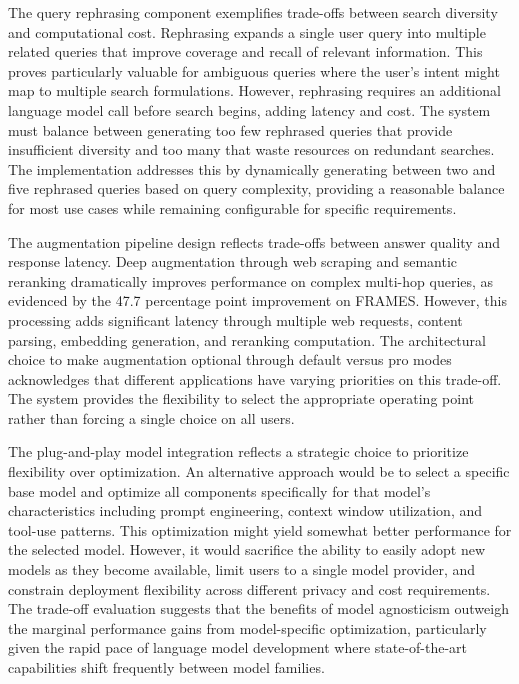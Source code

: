 The query rephrasing component exemplifies trade-offs between search diversity and computational cost. Rephrasing expands a single user query into multiple related queries that improve coverage and recall of relevant information. This proves particularly valuable for ambiguous queries where the user's intent might map to multiple search formulations. However, rephrasing requires an additional language model call before search begins, adding latency and cost. The system must balance between generating too few rephrased queries that provide insufficient diversity and too many that waste resources on redundant searches. The implementation addresses this by dynamically generating between two and five rephrased queries based on query complexity, providing a reasonable balance for most use cases while remaining configurable for specific requirements.

The augmentation pipeline design reflects trade-offs between answer quality and response latency. Deep augmentation through web scraping and semantic reranking dramatically improves performance on complex multi-hop queries, as evidenced by the 47.7 percentage point improvement on FRAMES. However, this processing adds significant latency through multiple web requests, content parsing, embedding generation, and reranking computation. The architectural choice to make augmentation optional through default versus pro modes acknowledges that different applications have varying priorities on this trade-off. The system provides the flexibility to select the appropriate operating point rather than forcing a single choice on all users.

The plug-and-play model integration reflects a strategic choice to prioritize flexibility over optimization. An alternative approach would be to select a specific base model and optimize all components specifically for that model's characteristics including prompt engineering, context window utilization, and tool-use patterns. This optimization might yield somewhat better performance for the selected model. However, it would sacrifice the ability to easily adopt new models as they become available, limit users to a single model provider, and constrain deployment flexibility across different privacy and cost requirements. The trade-off evaluation suggests that the benefits of model agnosticism outweigh the marginal performance gains from model-specific optimization, particularly given the rapid pace of language model development where state-of-the-art capabilities shift frequently between model families.

